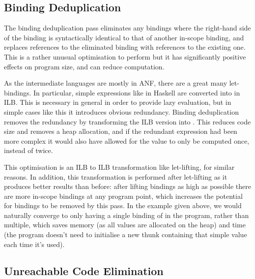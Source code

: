 \documentclass[dissertation.tex]{subfiles}
\begin{document}
{{    }
    \subsection{Binding Deduplication}\label{sec:binding-dedupe}
    {

        The binding deduplication pass eliminates any bindings where the right-hand side of the binding is
        syntactically identical to that of another in-scope binding, and replaces references to the eliminated
        binding with references to the existing one. This is a rather unusual optimisation to perform but it has
        significantly positive effects on program size, and can reduce computation.

        As the intermediate languages are mostly in ANF, there are a great many let-bindings. In particular, simple
        expressions like  in Haskell are converted into  in ILB. This is necessary in general in order to provide lazy evaluation, but in simple
        cases like this it introduces obvious redundancy. Binding deduplication removes the redundancy by
        transforming the ILB version into . This reduces code size and removes
        a heap allocation, and if the redundant expression had been more complex it would also have allowed for the
        value to only be computed once, instead of twice.

        This optimisation is an ILB to ILB transformation like let-lifting, for similar reasons. In addition, this
        transformation is performed after let-lifting as it produces better results than before: after lifting
        bindings as high as possible there are more in-scope bindings at any program point, which increases the
        potential for bindings to be removed by this pass. In the  example given above, we
        would naturally converge to only having a single binding of  in the program, rather than
        multiple, which saves memory (as all values are allocated on the heap) and time (the program doesn't need to
        initialise a new thunk containing that simple value each time it's used).

    }
    \subsection{Unreachable Code Elimination}\label{sec:unreachable-elim}
    {

}}
\end{document}
